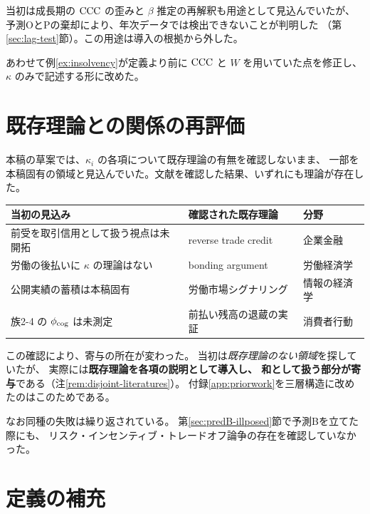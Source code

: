 当初は成長期の $\mathrm{CCC}$ の歪みと $\beta$ 推定の再解釈も用途として見込んでいたが、
予測OとPの棄却により、年次データでは検出できないことが判明した
（第\ref{sec:lag-test}節）。この用途は導入の根拠から外した。

あわせて例\ref{ex:insolvency}が定義より前に $\mathrm{CCC}$ と $W$ を用いていた点を修正し、
$\kappa$ のみで記述する形に改めた。

\section{既存理論との関係の再評価}

本稿の草案では、$\kappa_i$ の各項について既存理論の有無を確認しないまま、
一部を本稿固有の領域と見込んでいた。文献を確認した結果、いずれにも理論が存在した。

\begin{center}
\begin{tabularx}{\textwidth}{@{}lXl@{}}
\toprule
当初の見込み & 確認された既存理論 & 分野 \\
\midrule
前受を取引信用として扱う視点は未開拓 & reverse trade credit \cite{mateut2014,daripa2011} & 企業金融 \\
労働の後払いに $\kappa$ の理論はない & bonding argument \cite{akerlof1986} & 労働経済学 \\
公開実績の蓄積は本稿固有 & 労働市場シグナリング \cite{spence1973} & 情報の経済学 \\
族2-4 の $\phi_{\rm cog}$ は未測定 & 前払い残高の退蔵の実証 \cite{nber2026pnbl} & 消費者行動 \\
\bottomrule
\end{tabularx}
\label{tab:prior-theory-check}
\end{center}

この確認により、寄与の所在が変わった。
当初は\emph{既存理論のない領域}を探していたが、
実際には\textbf{既存理論を各項の説明として導入し、
和として扱う部分が寄与}である（注\ref{rem:disjoint-literatures}）。
付録\ref{app:priorwork}を三層構造に改めたのはこのためである。

なお同種の失敗は繰り返されている。
第\ref{sec:predB-illposed}節で予測Bを立てた際にも、
リスク・インセンティブ・トレードオフ論争の存在を確認していなかった。

\section{定義の補充}

